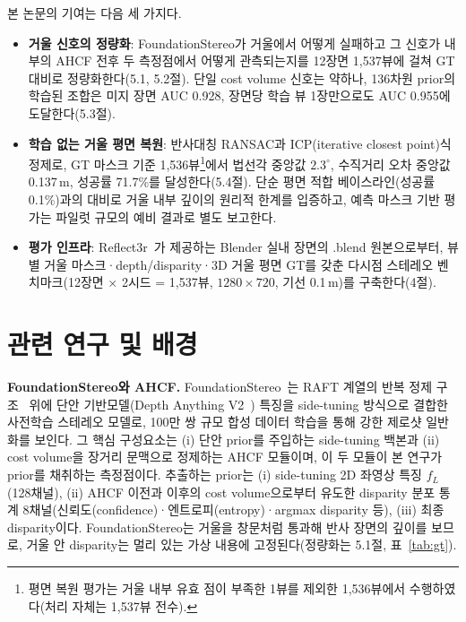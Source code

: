 \documentclass[twocolumn,10pt,a4paper]{article}
\begin{document}
본 논문의 기여는 다음 세 가지다.
\begin{itemize}\itemsep2pt
\item \textbf{거울 신호의 정량화}: FoundationStereo가 거울에서 어떻게 실패하고 그 신호가 내부의 AHCF 전후 두 측정점에서 어떻게 관측되는지를 12장면 1,537뷰에 걸쳐 GT 대비로 정량화한다(5.1, 5.2절). 단일 cost volume 신호는 약하나, 136차원 prior의 학습된 조합은 미지 장면 AUC 0.928, 장면당 학습 뷰 1장만으로도 AUC 0.955에 도달한다(5.3절).
\item \textbf{학습 없는 거울 평면 복원}: 반사대칭 RANSAC과 ICP(iterative closest point)식 정제로, GT 마스크 기준 1,536뷰\footnote{평면 복원 평가는 거울 내부 유효 점이 부족한 1뷰를 제외한 1,536뷰에서 수행하였다(처리 자체는 1,537뷰 전수).\label{fn:plane1536}}에서 법선각 중앙값 $2.3^{\circ}$, 수직거리 오차 중앙값 0.137\,m, 성공률 71.7\%를 달성한다(5.4절). 단순 평면 적합 베이스라인(성공률 0.1\%)과의 대비로 거울 내부 깊이의 원리적 한계를 입증하고, 예측 마스크 기반 평가는 파일럿 규모의 예비 결과로 별도 보고한다.
\item \textbf{평가 인프라}: Reflect3r~\cite{wu2026reflect3r}가 제공하는 Blender 실내 장면의 .blend 원본으로부터, 뷰별 거울 마스크·depth/disparity·3D 거울 평면 GT를 갖춘 다시점 스테레오 벤치마크(12장면 $\times$ 2시드 = 1,537뷰, $1280\times720$, 기선 0.1\,m)를 구축한다(4절).
\end{itemize}

\section{관련 연구 및 배경}

\textbf{FoundationStereo와 AHCF.} FoundationStereo~\cite{wen2025foundationstereo}는 RAFT 계열의 반복 정제 구조~\cite{lipson2021raftstereo} 위에 단안 기반모델(Depth Anything V2~\cite{yang2024depthanything}) 특징을 side-tuning 방식으로 결합한 사전학습 스테레오 모델로, 100만 쌍 규모 합성 데이터 학습을 통해 강한 제로샷 일반화를 보인다. 그 핵심 구성요소는 (i) 단안 prior를 주입하는 side-tuning 백본과 (ii) cost volume을 장거리 문맥으로 정제하는 AHCF 모듈이며, 이 두 모듈이 본 연구가 prior를 채취하는 측정점이다. 추출하는 prior는 (i) side-tuning 2D 좌영상 특징 $f_L$(128채널), (ii) AHCF 이전과 이후의 cost volume으로부터 유도한 disparity 분포 통계 8채널(신뢰도(confidence)·엔트로피(entropy)·argmax disparity 등), (iii) 최종 disparity이다. FoundationStereo는 거울을 창문처럼 통과해 반사 장면의 깊이를 보므로, 거울 안 disparity는 멀리 있는 가상 내용에 고정된다(정량화는 5.1절, 표~\ref{tab:gt}).
\end{document}
